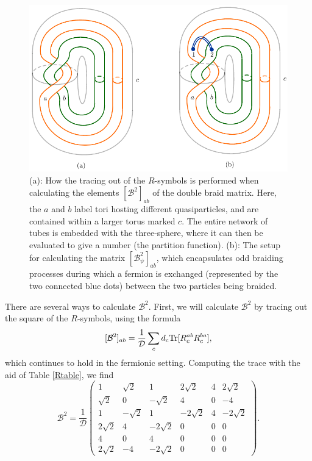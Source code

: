 \documentclass[12pt,a4paper]{article}
\newcommand{\mcb}{\mathcal{B}}
\newcommand{\mcd}{\mathcal{D}}
\newcommand\be            {\begin{equation}}
\newcommand\ee            {\end{equation}}
\begin{document}
\begin{figure}
\begin{center}
\includegraphics{both_braided_tubes.pdf}
\caption{\label{braided_tubes} 
(a): How the tracing out of the $R$-symbols is performed when calculating the elements $[\mcb^2]_{ab}$ of the double braid matrix. 
Here, the $a$ and $b$ label tori hosting different quasiparticles, and are contained within a larger torus marked $c$. 
The entire network of tubes is embedded with the three-sphere, where it can then be evaluated to give a number (the partition function). 
(b): The setup for calculating the matrix $[\mcb^2_\psi]_{ab}$, which encapsulates odd braiding processes during which a fermion is exchanged (represented by the two connected blue dots) between the two particles being braided. }
\end{center}
\end{figure}

There are 
several ways to calculate $\mcb^2$. 
First, we will calculate $\mcb^2$ by tracing out the square of the $R$-symbols, using the formula \cite{Bonderson2007}
\be \label{Smattr} [\mcb^2]_{ab} = \frac{1}{\mcd}\sum_{c}d_c{\rm Tr}[R^{ab}_cR^{ba}_c],\ee
which continues to hold in the fermionic setting. 
Computing the trace with the aid of Table \ref{Rtable}, we find
\be \label{statistical_S}
 \mcb^2= \frac{1}{\mcd} \begin{pmatrix} 
1&\sqrt{2}&1&2\sqrt{2}&4&2\sqrt{2} \\
 \sqrt{2}&0&-\sqrt{2}&4&0&-4 \\ 
 1&-\sqrt{2}&1&-2\sqrt{2}&4&-2\sqrt{2} \\ 
 2\sqrt{2}&4& -2\sqrt{2}&0&0&0 \\ 
 4&0&4&0&0&0 \\ 
  2\sqrt{2}&-4&- 2\sqrt{2}&0 & 0 & 0 \end{pmatrix}. \ee
  
\end{document}
